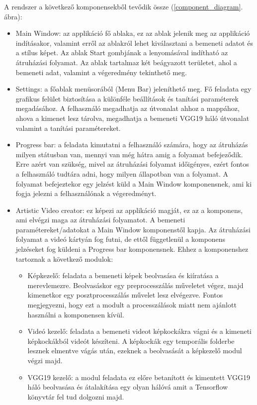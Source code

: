 \documentclass[12pt, a4paper, oneside]{book}
\theoremstyle{tetel}
\begin{document}
A rendszer a következő komponensekből tevődik össze (\ref{component_diagram}. ábra):
\begin{itemize}
	\item Main Window: az applikáció fő ablaka, ez az ablak jelenik meg az applikáció indításakor, valamint erről az ablakról lehet kiválasztani a bemeneti adatot és a stílus képet. Az ablak Start gombjának a lenyomásával indítható az átruházási folyamat. Az ablak tartalmaz két beágyazott területet, ahol a bemeneti adat, valamint a végeredmény tekinthető meg.
	\item Settings: a főablak menüsorából (Menu Bar) jeleníthető meg. Fő feladata egy grafikus felület biztosítása a különféle beállítások és tanítási paraméterek megadásához. A felhasználó megadhatja az útvonalat ahhoz a mappához, ahova a kimenet lesz tárolva, megadhatja a bemeneti VGG19 háló útvonalat valamint a tanítási paramétereket.
	\item Progress bar: a feladata kimutatni a felhasználó számára, hogy az átruházás milyen státusban van, mennyi van még hátra amig a folyamat befejeződik. Erre azért van szükség, mivel az átruházási folyamat időigényes, ezért fontos a felhasználó tudtára adni, hogy milyen állapotban van a folyamat. A folyamat befejeztekor egy jelzést küld a Main Window komponensnek, ami ki fogja jelezni a felhasználónak a végeredményt.
	\item Artistic Video creator: ez képezi az applikáció magját, ez az a komponens, ami elvégzi maga az átruházási folyamatot. A bemeneti paramétereket/adatokat a Main Window komponenstől kapja. Az átruházási folyamat a videó kártyán fog futni, de ettől függetlenül a komponens jelzéseket fog küldeni a Progress bar komponensnek. Ehhez a komponenshez tartoznak a következő modulok:
	\begin{itemize}
		\item Képkezelő: feladata a bemeneti képek beolvasása és kiíratása a merevlemezre. Beolvasáskor egy preprocesszálás műveletet végez, majd kimenetkor egy posztprocesszálás művelet lesz elvégezve. Fontos megjegyezni, hogy ezt a modult a processzálások miatt nem ajánlott használni a komponensen kívül.  
		\item Videó kezelő: feladata a bemeneti videot képkockákra vágni és a kimeneti képkockákból videót készíteni. A képkockák egy temporális folderbe lesznek elmentve vágás után, ezeknek a beolvasását a képkezelő modul végzi majd.
		\item VGG19 kezelő: a modul feladata ez előre betanított és kimentett VGG19 háló beolvasása és átalakítása egy olyan hálóvá amit a Tensorflow könyvtár fel tud dolgozni majd.
	\end{itemize}
\end{itemize}
\end{document}
